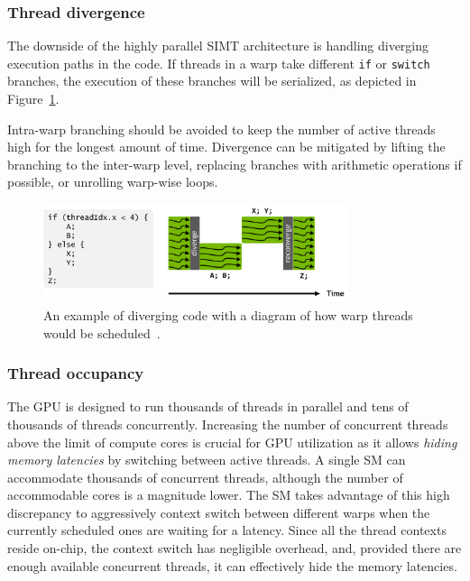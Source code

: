 \subsubsection{Thread divergence}
\label{sec:divergence}

The downside of the highly parallel SIMT architecture is handling diverging execution paths in the code. If threads in a warp take different \texttt{if} or \texttt{switch} branches, the execution of these branches will be serialized, as depicted in Figure~\ref{fig:divergence}.

Intra-warp branching should be avoided to keep the number of active threads high for the longest amount of time. Divergence can be mitigated by lifting the branching to the inter-warp level, replacing branches with arithmetic operations if possible, or unrolling warp-wise loops.

\begin{figure}
    \centering
    \includegraphics[width=0.8\textwidth]{img/divergence.png}
    \caption{An example of diverging code with a diagram of how warp threads would be scheduled~\cite{site:volta}.}
    \label{fig:divergence}
\end{figure}

\subsubsection{Thread occupancy}
\label{sec:occupancy}

The GPU is designed to run thousands of threads in parallel and tens of thousands of threads concurrently. Increasing the number of concurrent threads above the limit of compute cores is crucial for GPU utilization as it allows \emph{hiding memory latencies} by switching between active threads. A single SM can accommodate thousands of concurrent threads, although the number of accommodable cores is a magnitude lower. The SM takes advantage of this high discrepancy to aggressively context switch between different warps when the currently scheduled ones are waiting for a latency. Since all the thread contexts reside on-chip, the context switch has negligible overhead, and, provided there are enough available concurrent threads, it can effectively hide the memory latencies.

